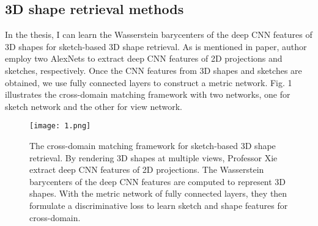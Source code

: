 \documentclass{article}
\begin{document}
\subsection{3D shape retrieval methods}
  In the thesis, I can learn the Wasserstein barycenters of the deep CNN features of 3D shapes for sketch-based 3D shape retrieval. As is mentioned in paper, author employ two AlexNets to extract deep CNN features of 2D projections and sketches, respectively. Once the CNN features from 3D shapes and sketches are obtained, we use fully connected layers to construct a metric network. Fig. 1 illustrates the cross-domain matching framework with two networks, one for sketch network and the other for view network.
  
\begin{figure}[ht]
\centering
\texttt{[image: 1.png]}
\caption{The cross-domain matching framework for sketch-based 3D shape retrieval. By rendering 3D shapes at multiple views, Professor Xie extract deep CNN features of 2D projections. The Wasserstein barycenters of the deep CNN features are computed to represent 3D shapes. With the metric network of fully connected layers, they then formulate a discriminative loss to learn sketch and shape features for cross-domain.}
\end{figure}
  

\end{document}
